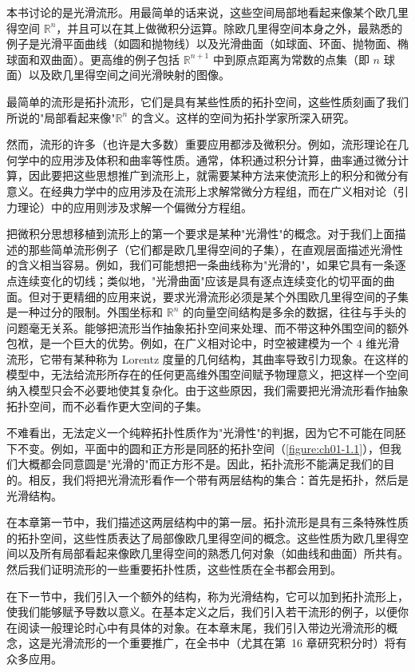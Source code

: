 \documentclass[../../main.tex]{subfiles}
\begin{document}
本书讨论的是光滑流形。用最简单的话来说，这些空间局部地看起来像某个欧几里得空间 $\mathbb{R}^{n}$，并且可以在其上做微积分运算。除欧几里得空间本身之外，最熟悉的例子是光滑平面曲线（如圆和抛物线）以及光滑曲面（如球面、环面、抛物面、椭球面和双曲面）。更高维的例子包括 $\mathbb{R}^{n+1}$ 中到原点距离为常数的点集（即 $n$ 球面）以及欧几里得空间之间光滑映射的图像。

最简单的流形是拓扑流形，它们是具有某些性质的拓扑空间，这些性质刻画了我们所说的"局部看起来像"$\mathbb{R}^{n}$ 的含义。这样的空间为拓扑学家所深入研究。

然而，流形的许多（也许是大多数）重要应用都涉及微积分。例如，流形理论在几何学中的应用涉及体积和曲率等性质。通常，体积通过积分计算，曲率通过微分计算，因此要把这些思想推广到流形上，就需要某种方法来使流形上的积分和微分有意义。在经典力学中的应用涉及在流形上求解常微分方程组，而在广义相对论（引力理论）中的应用则涉及求解一个偏微分方程组。

把微积分思想移植到流形上的第一个要求是某种"光滑性"的概念。对于我们上面描述的那些简单流形例子（它们都是欧几里得空间的子集），在直观层面描述光滑性的含义相当容易。例如，我们可能想把一条曲线称为"光滑的"，如果它具有一条逐点连续变化的切线；类似地，"光滑曲面"应该是具有逐点连续变化的切平面的曲面。但对于更精细的应用来说，要求光滑流形必须是某个外围欧几里得空间的子集是一种过分的限制。外围坐标和 $\mathbb{R}^{n}$ 的向量空间结构是多余的数据，往往与手头的问题毫无关系。能够把流形当作抽象拓扑空间来处理、而不带这种外围空间的额外包袱，是一个巨大的优势。例如，在广义相对论中，时空被建模为一个 $4$ 维光滑流形，它带有某种称为 Lorentz 度量的几何结构，其曲率导致引力现象。在这样的模型中，无法给流形所存在的任何更高维外围空间赋予物理意义，把这样一个空间纳入模型只会不必要地使其复杂化。由于这些原因，我们需要把光滑流形看作抽象拓扑空间，而不必看作更大空间的子集。

不难看出，无法定义一个纯粹拓扑性质作为"光滑性"的判据，因为它不可能在同胚下不变。例如，平面中的圆和正方形是同胚的拓扑空间（\cref{figure:ch01-1.1}），但我们大概都会同意圆是"光滑的"而正方形不是。因此，拓扑流形不能满足我们的目的。相反，我们将把光滑流形看作一个带有两层结构的集合：首先是拓扑，然后是光滑结构。

在本章第一节中，我们描述这两层结构中的第一层。拓扑流形是具有三条特殊性质的拓扑空间，这些性质表达了局部像欧几里得空间的概念。这些性质为欧几里得空间以及所有局部看起来像欧几里得空间的熟悉几何对象（如曲线和曲面）所共有。然后我们证明流形的一些重要拓扑性质，这些性质在全书都会用到。

在下一节中，我们引入一个额外的结构，称为光滑结构，它可以加到拓扑流形上，使我们能够赋予导数以意义。在基本定义之后，我们引入若干流形的例子，以便你在阅读一般理论时心中有具体的对象。在本章末尾，我们引入带边光滑流形的概念，这是光滑流形的一个重要推广，在全书中（尤其在第~16 章研究积分时）将有众多应用。
\end{document}
